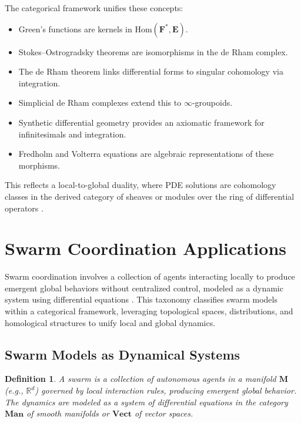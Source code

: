 \documentclass{article}
\theoremstyle{plain}
\newtheorem{definition}{Definition}[section]
\newcommand{\cat}[1]{\mathbf{#1}}
\newcommand{\Hom}{\mathrm{Hom}}
\begin{document}
The categorical framework unifies these concepts:
\begin{itemize}
    \item Green's functions are kernels in \(\Hom(\cat{F}^*, \cat{E})\).
    \item Stokes--Ostrogradsky theorems are isomorphisms in the de Rham complex.
    \item The de Rham theorem links differential forms to singular cohomology via integration.
    \item Simplicial de Rham complexes extend this to \(\infty\)-groupoids.
    \item Synthetic differential geometry provides an axiomatic framework for infinitesimals and integration.
    \item Fredholm and Volterra equations are algebraic representations of these morphisms.
\end{itemize}

This reflects a local-to-global duality, where PDE solutions are cohomology
classes in the derived category of sheaves or modules over the ring of differential
operators \cite{nLab_de_Rham_theorem, nLab_synthetic_diff_geom}.

\section{Swarm Coordination Applications}

Swarm coordination involves a collection of agents interacting locally to produce
emergent global behaviors without centralized control, modeled as a dynamic system
using differential equations \cite{nLab_dynamical_systems}. This taxonomy classifies
swarm models within a categorical framework, leveraging topological spaces,
distributions, and homological structures to unify local and global dynamics.

\subsection{Swarm Models as Dynamical Systems}

\begin{definition}
A \emph{swarm} is a collection of autonomous agents in a manifold \(\cat{M}\) (e.g., \(\mathbb{R}^d\))
governed by local interaction rules, producing emergent global behavior. The dynamics are modeled
as a system of differential equations in the category \(\cat{Man}\) of smooth manifolds or \(\cat{Vect}\) of vector spaces.
\end{definition}
\end{document}
